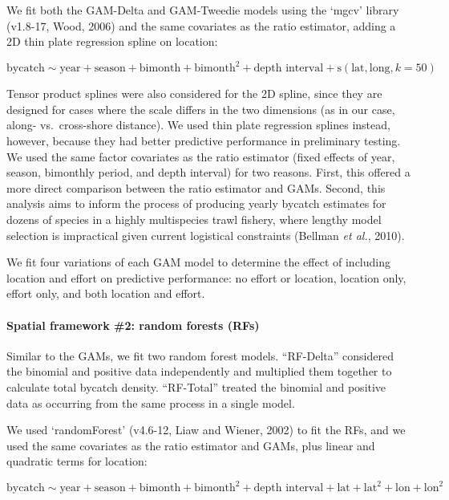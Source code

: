 \documentclass[]{article}
\let\oldparagraph\paragraph
\renewcommand{\paragraph}[1]{\oldparagraph{#1}\mbox{}}
\begin{document}
We fit both the GAM-Delta and GAM-Tweedie models using the `mgcv'
library (v1.8-17, Wood, 2006) and the same covariates as the ratio
estimator, adding a 2D thin plate regression spline on location:

\[ \text{bycatch} \sim \text{year} + \text{season} + \text{bimonth} + \text{bimonth}^2 + \text{depth interval} + \text{s}(\text{lat}, \text{long}, k=50) \]

Tensor product splines were also considered for the 2D spline, since
they are designed for cases where the scale differs in the two
dimensions (as in our case, along- vs.~cross-shore distance). We used
thin plate regression splines instead, however, because they had better
predictive performance in preliminary testing. We used the same factor
covariates as the ratio estimator (fixed effects of year, season,
bimonthly period, and depth interval) for two reasons. First, this
offered a more direct comparison between the ratio estimator and GAMs.
Second, this analysis aims to inform the process of producing yearly
bycatch estimates for dozens of species in a highly multispecies trawl
fishery, where lengthy model selection is impractical given current
logistical constraints (Bellman \emph{et al.}, 2010).

We fit four variations of each GAM model to determine the effect of
including location and effort on predictive performance: no effort or
location, location only, effort only, and both location and effort.

\hypertarget{spatial-framework-2-random-forests-rfs}{%
\paragraph{Spatial framework \#2: random forests
(RFs)}\label{spatial-framework-2-random-forests-rfs}}

Similar to the GAMs, we fit two random forest models. ``RF-Delta''
considered the binomial and positive data independently and multiplied
them together to calculate total bycatch density. ``RF-Total'' treated
the binomial and positive data as occurring from the same process in a
single model.

We used `randomForest' (v4.6-12, Liaw and Wiener, 2002) to fit the RFs,
and we used the same covariates as the ratio estimator and GAMs, plus
linear and quadratic terms for location:

\[ \text{bycatch} \sim \text{year} + \text{season} + \text{bimonth} + \text{bimonth}^2 + \text{depth interval} + \text{lat} + \text{lat}^2 + \text{lon} + \text{lon}^2\]
\end{document}
